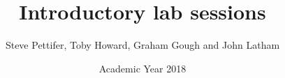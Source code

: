 \title{Introductory lab sessions}
\date{Academic Year 2018}
\author{Steve Pettifer, Toby Howard, Graham Gough and John Latham}




\dominitoc
 





\setcounter{chapter}{-1}
\renewcommand{\chaptername}{Welcome Lab Session}

\renewcommand{\chaptername}{Intro Lab Session}






\printbibliography

